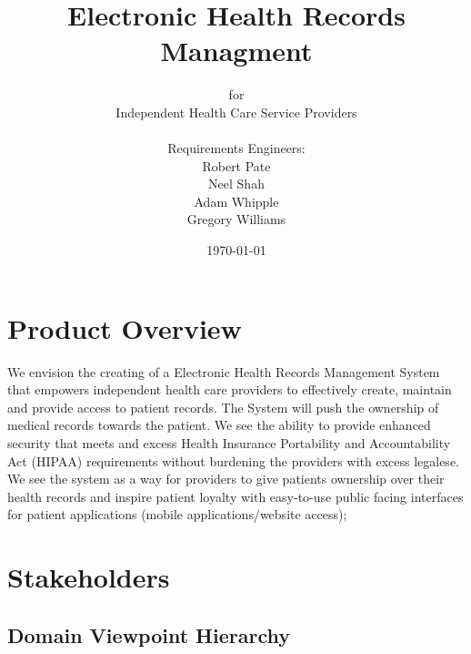 \documentclass[12pt]{article}
\begin{document}
\begin{titlepage}
\title{\color{cyan}Electronic Health Records Managment}
\author{for\\{\color{blue}Independent Health Care Service Providers}\\
	\\{\small Requirements Engineers:}
\\Robert Pate\\Neel Shah\\Adam Whipple\\Gregory Williams}
\date{\today}



\maketitle
\vfill
\end{titlepage}

\section{Product Overview}

We envision the creating of a Electronic Health Records Management System that empowers independent health care providers to effectively create, maintain and provide access to patient records. The System will push the ownership of medical records towards the patient. We see the ability to provide enhanced security that meets and excess Health Insurance Portability and Accountability Act (HIPAA) requirements without burdening the providers with excess legalese. We see the system as a way for providers to give patients ownership over their health records and inspire patient loyalty with easy-to-use public facing interfaces for patient applications (mobile applications/website access);

\section{Stakeholders}

\subsection{Domain Viewpoint Hierarchy}
\end{document}
